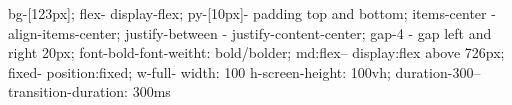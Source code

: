 bg-[123px];
flex- display-flex;
py-[10px]- padding top and bottom;
items-center - align-items-center;
justify-between - justify-content-center;
gap-4 - gap left and right 20px;
font-bold-font-weitht: bold/bolder;
md:flex-- display:flex above 726px;
fixed- position:fixed;
w-full- width: 100%
h-screen-height: 100vh;
duration-300--transition-duration: 300ms